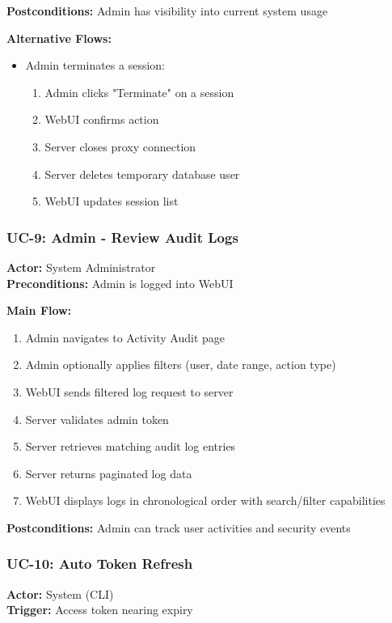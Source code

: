 \textbf{Postconditions:} Admin has visibility into current system usage

\textbf{Alternative Flows:}
\begin{itemize}
    \item Admin terminates a session:
    \begin{enumerate}
        \item Admin clicks "Terminate" on a session
        \item WebUI confirms action
        \item Server closes proxy connection
        \item Server deletes temporary database user
        \item WebUI updates session list
    \end{enumerate}
\end{itemize}

\subsubsection{UC-9: Admin - Review Audit Logs}
\textbf{Actor:} System Administrator \\
\textbf{Preconditions:} Admin is logged into WebUI

\textbf{Main Flow:}
\begin{enumerate}
    \item Admin navigates to Activity Audit page
    \item Admin optionally applies filters (user, date range, action type)
    \item WebUI sends filtered log request to server
    \item Server validates admin token
    \item Server retrieves matching audit log entries
    \item Server returns paginated log data
    \item WebUI displays logs in chronological order with search/filter capabilities
\end{enumerate}

\textbf{Postconditions:} Admin can track user activities and security events

\subsubsection{UC-10: Auto Token Refresh}
\textbf{Actor:} System (CLI) \\
\textbf{Trigger:} Access token nearing expiry


